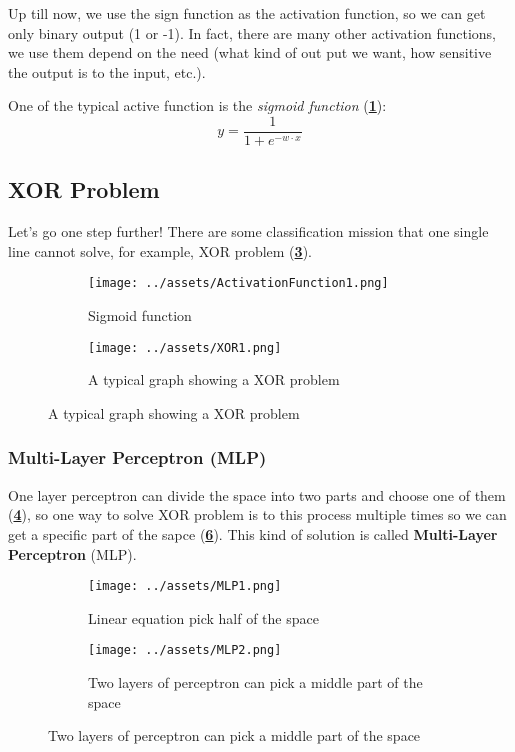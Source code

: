 \documentclass[a4paper, openany]{book}
\begin{document}
Up till now, we use the sign function as the activation function, so we can get only binary output (1 or -1). In fact, there are many other activation functions, we use them depend on the need (what kind of out put we want, how sensitive the output is to the input, etc.).

One of the typical active function is the \textit{sigmoid function} (\textbf{\cref{fig:SigmoidFunction}}):
$$y = \frac{1}{1 + e^{-w \cdot x}}$$

\subsection{XOR Problem}

Let's go one step further! There are some classification mission that one single line cannot solve, for example, XOR problem (\textbf{\cref{fig:XOR}}).

\begin{figure}[htbp]
  \centering
  \begin{subfigure}{0.3\textwidth}
    \centering
    \texttt{[image: ../assets/ActivationFunction1.png]}
    \caption{Sigmoid function}
    \label{fig:SigmoidFunction}
  \end{subfigure}
  \begin{subfigure}{0.3\textwidth}
    \texttt{[image: ../assets/XOR1.png]}
    \caption{A typical graph showing a XOR problem}
    \label{fig:XOR}
  \end{subfigure}
\end{figure}

\subsubsection{Multi-Layer Perceptron (MLP)}\label{sec:MLP}

One layer perceptron can divide the space into two parts and choose one of them (\textbf{\cref{fig:MLP1}}), so one way to solve XOR problem is to this process multiple times so we can get a specific part of the sapce (\textbf{\cref{fig:MLP2}}). This kind of solution is called \textbf{Multi-Layer Perceptron} (MLP).

\begin{figure}[htbp]
  \centering
  \begin{subfigure}{0.49\textwidth}
    \centering
    \texttt{[image: ../assets/MLP1.png]}
    \caption{Linear equation pick half of the space}
    \label{fig:MLP1}
  \end{subfigure}
  \begin{subfigure}{0.49\textwidth}
    \centering
    \texttt{[image: ../assets/MLP2.png]}
    \caption{Two layers of perceptron can pick a middle part of the space}
    \label{fig:MLP2}
  \end{subfigure}
\end{figure}
\end{document}
